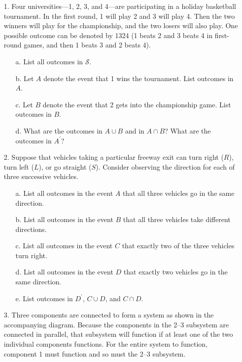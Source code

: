 \documentclass[letterpaper,12pt]{article}
\begin{document}
\maketitle

\begin{enumerate}
  \item[1.]
    Four universities---1, 2, 3, and 4---are participating in a holiday basketball tournament. In the first round, 1 will play 2 and 3 will play 4. Then the two winners will play for the championship, and the two losers will also play. One possible outcome can be denoted by 1324 (1 beats 2 and 3 beats 4 in first-round games, and then 1 beats 3 and 2 beats 4).
    \begin{enumerate}
      \item[a.]
        List all outcomes in $\mathcal{S}$.
      \item[b.]
        Let $A$ denote the event that 1 wins the tournament. List outcomes in $A$.
      \item[c.]
        Let $B$ denote the event that 2 gets into the championship game. List outcomes in $B$.
      \item[d.]
        What are the outcomes in $A \cup B$ and in $A \cap B$? What are the outcomes in $A^\prime$?
    \end{enumerate}
  \item[2.]
    Suppose that vehicles taking a particular freeway exit can turn right ($R$), turn left ($L$), or go straight ($S$). Consider observing the direction for each of three successive vehicles.
    \begin{enumerate}
      \item[a.]
        List all outcomes in the event $A$ that all three vehicles go in the same direction.
      \item[b.]
        List all outcomes in the event $B$ that all three vehicles take different directions.
      \item[c.]
        List all outcomes in the event $C$ that exactly two of the three vehicles turn right.
      \item[d.]
        List all outcomes in the event $D$ that exactly two vehicles go in the same direction.
      \item[e.]
        List outcomes in $D^\prime$, $C \cup D$, and $C \cap D$.
    \end{enumerate}
  \item[3.]
    Three components are connected to form a system as shown in the accompanying diagram. Because the components in the 2–3 subsystem are connected in parallel, that subsystem will function if at least one of the two individual components functions. For the entire system to function, component 1 must function and so must the 2–3 subsystem.
    \begin{center}
\end{center}
\end{enumerate}
\end{document}
